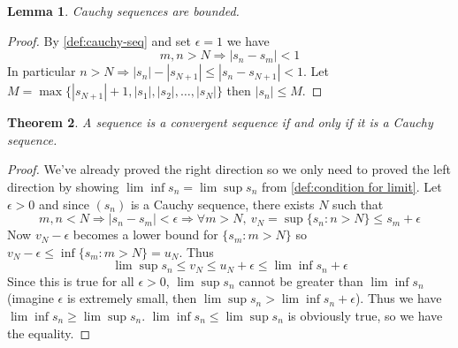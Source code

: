 \documentclass[12pt, lettersize]{book}
\newtheorem{thm}{Theorem}[section]
\newtheorem{lem}[thm]{Lemma}
\begin{document}
		\begin{lem}
		Cauchy sequences are bounded.
		\end{lem}
		\begin{proof}
		By \ref{def:cauchy-seq} and set $\epsilon=1$ we have
		\begin{displaymath}
			m,n>N\Rightarrow|s_n-s_m|<1
		\end{displaymath}
		In particular $n>N\Rightarrow |s_n|-|s_{N+1}|\leq|s_n-s_{N+1}|<1$. Let $M=\max\{|s_{N+1}|+1,|s_1|,|s_2|,\dots,|s_N|\}$ then $|s_n|\leq M$.
		\end{proof}
	
		\begin{thm}\label{def:cauchy iff convergent}
		A sequence is a convergent sequence if and only if it is a Cauchy sequence.
		\end{thm}
		\begin{proof}
		We've already proved the right direction so we only need to proved the left direction by showing $\lim\inf s_n=\lim\sup s_n$ from \ref{def:condition for limit}.
		Let $\epsilon>0$ and since $(s_n)$ is a Cauchy sequence, there exists $N$ such that
		\begin{displaymath}
			m,n<N \Rightarrow |s_n-s_m|<\epsilon\Rightarrow \forall m>N,\ v_N=\sup\{s_n: n>N\}\leq s_m+\epsilon
		\end{displaymath}
		Now $v_N-\epsilon$ becomes a lower bound for $\{s_m: m>N\}$ so $v_N-\epsilon\leq\inf\{s_m: m>N\}=u_N$.
		Thus
		\begin{displaymath}
			\lim\sup s_n\leq v_N\leq u_N+\epsilon\leq\lim\inf s_n+\epsilon
		\end{displaymath}
		Since this is true for all $\epsilon>0$, $\lim\sup s_n$ cannot be greater than $\lim\inf s_n$ (imagine $\epsilon$ is extremely small, then $\lim\sup s_n>\lim\inf s_n+\epsilon$). Thus we have $\lim\inf s_n\geq\lim\sup s_n$. $\lim\inf s_n\leq\lim\sup s_n$ is obviously true, so we have the equality.
		\end{proof}
		\newpage
		
\end{document}
